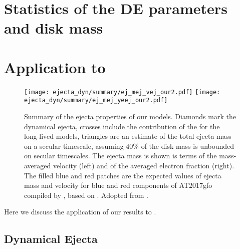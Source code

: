 
\section{Statistics of the \ac{DE} parameters and disk mass}



\section{Application to \GW{}}


\begin{figure*}[t]
    \centering 
    \texttt{[image: ejecta\_dyn/summary/ej\_mej\_vej\_our2.pdf]}
    \texttt{[image: ejecta\_dyn/summary/ej\_mej\_yeej\_our2.pdf]}
    \caption{
        Summary of the ejecta properties of our models.
        Diamonds mark the dynamical ejecta, crosses include the
        contribution of the \swind{} for the long-lived models, 
        triangles are an estimate of the total ejecta mass on a secular
        timescale, assuming $40\%$ of the disk mass is unbounded on
        secular timescales.         
        The ejecta mass is shown is terms of the mass-averaged velocity
        (left) and of the averaged electron fraction (right).
        The filled blue and red patches are the expected values of
        ejecta mass and velocity for blue and red components of
        AT2017gfo compiled by \cite{Siegel:2019mlp}, based on
        \cite{Villar:2017wcc}. 
        Adopted from \citet{Nedora:2020pak}.
    }
    \label{fig:ejecta:dyn:ds_sww}
\end{figure*}



Here we discuss the application of our results to \GW{}.


\subsection{Dynamical Ejecta}


